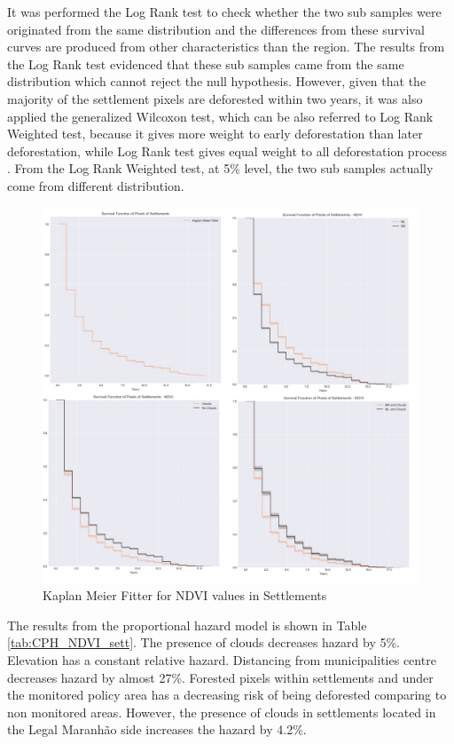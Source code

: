 It was performed the Log Rank test \citep{Peto_1972} to check whether the two sub samples were originated from the same distribution and the differences from these survival curves are produced from other characteristics than the region. The results from the Log Rank test evidenced that these sub samples came from the same distribution which cannot reject the null hypothesis. However, given that the majority of the settlement pixels are deforested within two years, it was also applied the generalized Wilcoxon test, which can be also referred to Log Rank Weighted test, because it gives more weight to early deforestation than later deforestation, while Log Rank test gives equal weight to all deforestation process \citep{lee_wang_2003}. From the Log Rank Weighted test, at 5\% level, the two sub samples actually come from different distribution.

\begin{figure}[H]
  \centering
  \includegraphics[width=1\textwidth]{KM_NDVI_sett_total.jpg}
\caption{Kaplan Meier Fitter for NDVI values in Settlements}
\label{fig:km-total-sett}
\end{figure}

The results from the proportional hazard model is shown in Table \ref{tab:CPH_NDVI_sett}. The presence of clouds decreases hazard by 5\%. Elevation has a constant relative hazard. Distancing from municipalities centre decreases hazard by almost 27\%. Forested pixels within settlements and under the monitored policy area has a decreasing risk of being deforested comparing to non monitored areas. However, the presence of clouds in settlements located in the Legal Maranhão side increases the hazard by 4.2\%.


